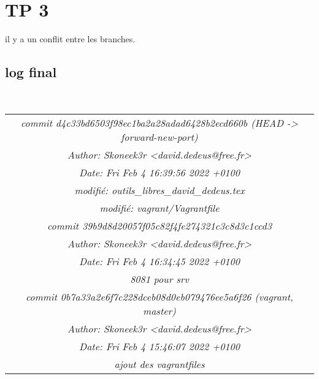 \documentclass{report}
\begin{document}
\section{TP 3}
il y a un conflit entre les branches.
\subsection{log final}
\\
\begin{tabular}{|c|}
\hline
\textit{commit d4c33bd6503f98ec1ba2a28adad6428b2ecd660b (HEAD -> forward-new-port)}\\
\textit{Author: Skoneek3r <david.dedeus@free.fr>}\\
\textit{Date:   Fri Feb 4 16:39:56 2022 +0100}\\
\textit{modifié: outils\_libres\_david\_dedeus.tex}\\
\textit{modifié: vagrant/Vagrantfile}\\
\textit{commit 39b9d8d20057f05c82f4fe274321c3c8d3c1ccd3}\\
\textit{Author: Skoneek3r <david.dedeus@free.fr>}\\
\textit{Date:   Fri Feb 4 16:34:45 2022 +0100}\\
\textit{ 8081 pour srv}\\
\textit{commit 0b7a33a2e6f7c228dceb08d0eb079476ee5a6f26 (vagrant, master)}\\
\textit{Author: Skoneek3r <david.dedeus@free.fr>}\\
\textit{Date:   Fri Feb 4 15:46:07 2022 +0100}\\
\textit{    ajout des vagrantfiles}\\
\hline
\end{tabular}
\\
\end{document}
